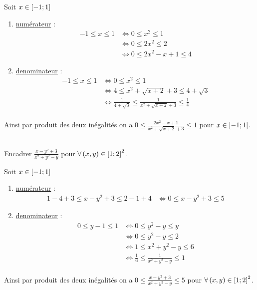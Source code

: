 \begin{corr}
	Soit \(x \in \left[-1;1\right] \)
	\begin{enumerate}
		\item \underline{numérateur} :
		      \[\begin{aligned}
				      -1 \leq x\leq 1 & \iff 0 \leq x^2 \leq 1      \\
				                      & \iff 0 \leq 2x^2 \leq 2     \\
				                      & \iff 0 \leq 2x^2-x+1 \leq 4
			      \end{aligned}
		      \]

		\item \underline{denominateur} : \[\begin{aligned}
				      -1 \leq x\leq 1 & \iff 0 \leq x^2 \leq 1                                                      \\
				                      & \iff 4 \leq x^2 +\sqrt{x+2}+3 \leq 4+\sqrt{3}                               \\
				                      & \iff \frac{1}{4+\sqrt{3}} \leq \frac{1}{x^2 +\sqrt{x+2}+3 }\leq \frac{1}{4} \\
			      \end{aligned}
		      \]
	\end{enumerate}
	Ainsi par produit des deux inégalités on a \(0\leq\frac{2x^2-x+1}{x^2+\sqrt{x+2}+3}\leq1\) pour \(x \in \left[-1;1\right]\).
\end{corr}

\begin{exoex}
    ~\\
	Encadrer \(\frac{x-y^2+3}{x^2+y^2-y}\) pour \(\forall \left(x,y\right) \in \left[1;2\right]^2\).
\end{exoex}

\begin{corr}
	Soit \(x \in \left[-1;1\right] \)
	\begin{enumerate}
		\item \underline{numérateur} :
		      \[\begin{aligned}
				      1-4+3\leq x-y^2+3 \leq 2-1+4 & \iff 0 \leq x-y^2+3 \leq 5
			      \end{aligned}
		      \]

		\item \underline{denominateur} : \[\begin{aligned}
				      0 \leq y-1\leq 1 & \iff 0 \leq y^2-y \leq y                        \\
				                       & \iff 0 \leq y^2-y \leq 2                        \\
				                       & \iff 1 \leq x^2+y^2-y\leq 6                     \\
				                       & \iff \frac{1}{6} \leq \frac{1}{x^2+y^2-y}\leq 1 \\
			      \end{aligned}
		      \]
	\end{enumerate}
	Ainsi par produit des deux inégalités on a \(0\leq \frac{x-y^2+3}{x^2+y^2-y} \leq 5\) pour \(\forall \left(x,y\right) \in \left[1;2\right]^2\).
\end{corr}

